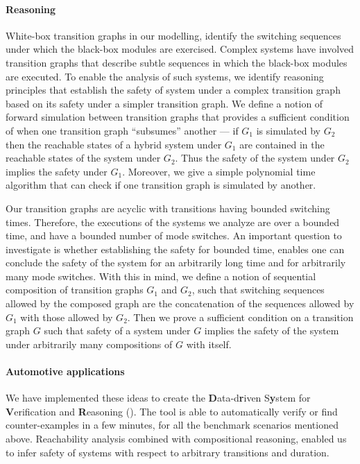 \paragraph{Reasoning}
White-box transition graphs in our modelling, identify the switching
sequences under which the black-box modules are exercised.  Complex
systems have involved transition graphs that describe subtle sequences
in which the black-box modules are executed. To enable the analysis of
such systems, we identify reasoning principles that establish the
safety of system under a complex transition graph based on its safety
under a simpler transition graph. We define a notion of forward
simulation between transition graphs that provides a sufficient
condition of when one transition graph ``subsumes'' another --- if
$G_1$ is simulated by $G_2$ then the reachable states of a hybrid
system under $G_1$ are contained in the reachable states of the system
under $G_2$. Thus the safety of the system under $G_2$ implies the
safety under $G_1$. Moreover, we give a simple polynomial time
algorithm that can check if one transition graph is simulated by
another.

Our transition graphs are acyclic with transitions having bounded
switching times. Therefore, the executions of the systems we analyze
are over a bounded time, and have a bounded number of mode
switches. An important question to investigate is whether establishing
the safety for bounded time, enables one can conclude the safety of
the system for an arbitrarily long time and for arbitrarily many mode
switches. With this in mind, we define a notion of sequential
composition of transition graphs $G_1$ and $G_2$, such that switching
sequences allowed by the composed graph are the concatenation of the
sequences allowed by $G_1$ with those allowed by $G_2$. Then we prove
a sufficient condition on a transition graph $G$ such that safety of a
system under $G$ implies the safety of the system under arbitrarily
many compositions of $G$ with itself.

\vspace{-10pt}
\paragraph{Automotive applications}
We have implemented these ideas to create the {\bf D}ata-d{\bf r}iven
S{\bf y}stem for {\bf V}erification and {\bf R}easoning (\toolname).
The tool is able to automatically verify or find counter-examples in a
few minutes, for all the benchmark scenarios mentioned above.
Reachability analysis combined with compositional reasoning, enabled
us to infer safety of systems with respect to arbitrary transitions
and duration.
%
%

